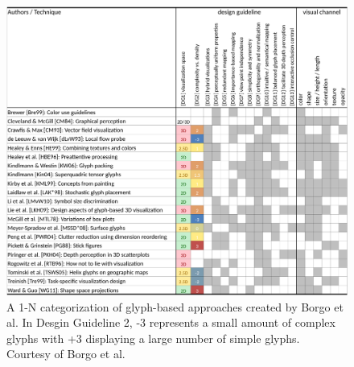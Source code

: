 \begin{figure}[t]
\begin{center}
\includegraphics[width=1\textwidth]{images/borgo2013glyphFull}
\caption{A 1-N categorization of glyph-based approaches created by Borgo et al. In Desgin Guideline 2, -3 represents a small amount of complex glyphs with +3 displaying a large number of simple glyphs. Courtesy of Borgo et al.\ \cite{borgo2013glyph}} \label{fig: borgo2013glyph}
\end{center}
\end{figure}


